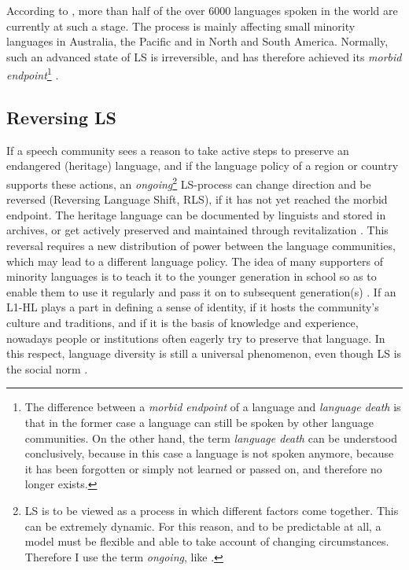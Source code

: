 \documentclass[output=paper]{langscibook}
\begin{document}
According to \textcite[7]{Nettle2000}, more than half of the over 6000 languages spoken in the world are currently at such a stage. The process is mainly affecting small minority languages in Australia, the Pacific and in North and South America. Normally, such an advanced state of LS is irreversible, and has therefore achieved its \emph{morbid endpoint}\footnote{The difference between a \emph{morbid endpoint} of a language and \emph{language death} is that in the former case a language can still be spoken by other language communities.  On the other hand, the term \emph{language death} can be understood conclusively, because in this case a language is not spoken anymore, because it has been forgotten or simply not learned or passed on, and therefore no longer exists.} \parencite[18]{Pauwels2016}.


\subsection{Reversing LS}\label{sec:karnopp:1.3}

If a speech community sees a reason to take active steps to preserve an endangered (heritage) language, and if the language policy of a region or country supports these actions, an \emph{ongoing}\footnote{LS is to be viewed as a process in which different factors come together. This can be extremely dynamic. For this reason, and to be predictable at all, a model must be flexible and able to take account of changing circumstances. Therefore I use the term \emph{ongoing}, like \textcite[112]{Pauwels2016}.} LS-process can change direction and be reversed (Reversing Language Shift, RLS), if it has not yet reached the morbid endpoint. The heritage language can be documented by linguists and stored in archives, or get actively preserved and maintained through revitalization \parencite[315]{Ostler2011}. This reversal requires a new distribution of power between the language communities, which may lead to a different language policy. The idea of many supporters of minority languages is to teach it to the younger generation in school so as to enable them to use it regularly and pass it on to subsequent generation(s) \parencite[4]{Puthuval2017}. If an L1-HL plays a part in defining a sense of identity, if it hosts the community's culture and traditions, and if it is the basis of knowledge and experience, nowadays people or institutions often eagerly try to preserve that language. In this respect, language diversity is still a universal phenomenon, even though LS is the social norm \parencite[84]{Pauwels2016}.
\end{document}
